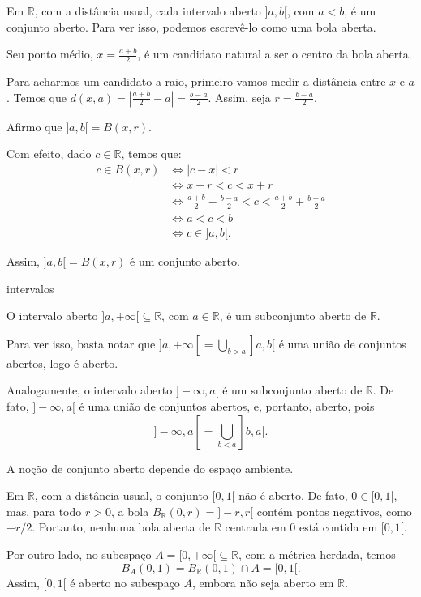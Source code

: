 \begin{example}\label{exemplo:intervalos-abertos-sao-abertos}
    Em $\mathbb R$, com a distância usual, cada intervalo aberto $]a, b[$, com $a<b$, é um conjunto aberto.
    Para ver isso, podemos escrevê-lo como uma bola aberta.
    
    Seu ponto médio, $x=\frac{a+b}{2}$, é um candidato natural a ser o centro da bola aberta.

    Para acharmos um candidato a raio, primeiro vamos medir a distância entre $x$ e $a$.
    Temos que $d(x, a) = \left|\frac{a+b}{2} - a\right| = \frac{b-a}{2}$.
    Assim, seja $r = \frac{b-a}{2}$.

    Afirmo que $]a, b[=B(x, r)$.

    Com efeito, dado $c \in \mathbb R$, temos que:
    \begin{align*}
        c \in B(x, r) 
        &\Leftrightarrow |c-x| < r \\
        &\Leftrightarrow x-r<c<x+r \\
        &\Leftrightarrow \frac{a+b}{2}-\frac{b-a}{2}<c<\frac{a+b}{2}+\frac{b-a}{2} \\
        &\Leftrightarrow a<c<b \\
        &\Leftrightarrow c \in ]a, b[.
    \end{align*}

    Assim, $]a, b[=B(x, r)$ é um conjunto aberto.
\end{example}

{intervalos}

\begin{example}
    O intervalo aberto $]a, +\infty[\subseteq \mathbb R$, com $a \in \mathbb R$, é um subconjunto aberto de $\mathbb R$.
    
    Para ver isso, basta notar que $]a, +\infty[ = \bigcup_{b>a} ]a, b[$ é uma união de conjuntos abertos, logo é aberto.

    Analogamente, o intervalo aberto $]-\infty, a[$ é um subconjunto aberto de $\mathbb R$.
    De fato, $]-\infty, a[$ é uma união de conjuntos abertos, e, portanto, aberto, pois
    \[
        ]-\infty, a[ = \bigcup_{b<a} ]b, a[.
    \]
\end{example}

A noção de conjunto aberto depende do espaço ambiente.

\begin{example}
    Em $\mathbb R$, com a distância usual, o conjunto $[0,1[$ não é aberto.
    De fato, $0\in [0,1[$, mas, para todo $r>0$, a bola $B_{\mathbb R}(0,r)=]-r,r[$ contém pontos negativos, como $-r/2$.
    Portanto, nenhuma bola aberta de $\mathbb R$ centrada em $0$ está contida em $[0,1[$.

    Por outro lado, no subespaço $A=[0,+\infty[\subseteq\mathbb R$, com a métrica herdada, temos
    \[
        B_A(0,1)=B_{\mathbb R}(0,1)\cap A=[0,1[.
    \]
    Assim, $[0,1[$ é aberto no subespaço $A$, embora não seja aberto em $\mathbb R$.
\end{example}

